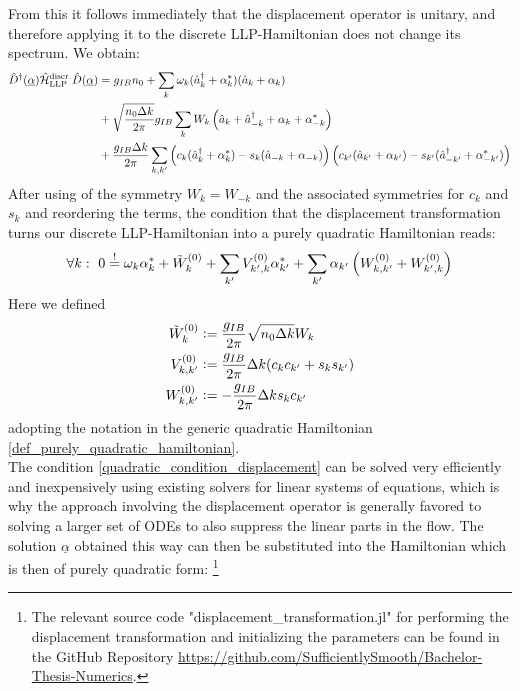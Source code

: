 From this it follows immediately that the displacement operator is unitary, and therefore applying it to the discrete LLP-Hamiltonian does not change its spectrum.
We obtain:
\begin{align}
\hat D^\dagger(\underline \alpha)\hat{\mathcal{H}}_{\mathrm{LLP}}^{\mathrm{discr.}}\hat D(\underline\alpha) &=g_{IB}n_0+\sum\limits_k \omega_{ k}(\hat a^\dagger_{ k}+\alpha_k^*)(\hat a_{ k}+\alpha_k)\nonumber\\
&+\sqrt{\frac{n_0\Delta k}{2\pi}}g_{IB}\sum\limits_k W_k \left(\hat a_{ k}+\hat a^\dagger_{- k}+\alpha_k+\alpha_{-k}^*\right) \nonumber\\ 
&+ \frac{g_{IB}\Delta k}{2\pi}\sum\limits_{k,k^\prime} \left(c_k(\hat a^\dagger_k+\alpha_k^*)-s_k(\hat a_{-k}+\alpha_{-k})\right)\left(c_{k^\prime}(\hat a_{k^\prime}+\alpha_{k^\prime})-s_{k^\prime}(\hat a^\dagger_{-k^\prime}+\alpha_{-k^\prime}^*)\right)
\end{align}
After using of the symmetry $W_k=W_{-k}$ and the associated symmetries for $c_k$ and $s_k$ and reordering the terms, the condition that the displacement transformation turns our discrete LLP-Hamiltonian into a purely quadratic Hamiltonian reads:
\begin{equation}\label{quadratic_condition_displacement}
\forall k:\ 0\overset{!}{=}\omega_k\alpha_k^*+\tilde W_k^{(0)}+\sum\limits_{k^\prime}V_{k^\prime,k}^{(0)}\alpha_{k^\prime}^*+\sum\limits_{k^\prime}\alpha_{k^\prime}\left(W_{k,k^\prime}^{(0)}+W_{k^\prime,k}^{(0)}\right)
\end{equation}
Here we defined
\begin{subequations}
\begin{align}
\tilde W_k^{(0)}&\vcentcolon= \frac{g_{IB}}{2\pi}\sqrt{n_0\Delta k} W_k\\
V_{k,k^\prime}^{(0)}&\vcentcolon=\frac{g_{IB}}{2\pi}\Delta k(c_k c_{k^\prime}+s_{k}s_{k^\prime})\\
W_{k,k^\prime}^{(0)}&\vcentcolon= -\frac{g_{IB}}{2\pi}\Delta k s_k c_{k^\prime}
\end{align}
\end{subequations}
adopting the notation in the generic quadratic Hamiltonian \ref{def_purely_quadratic_hamiltonian}.\\
The condition \ref{quadratic_condition_displacement} can be solved very efficiently and inexpensively using existing solvers for linear systems of equations, which is why the approach involving the displacement operator is generally favored to solving a larger set of ODEs to also suppress the linear parts in the flow. The solution $\underline\alpha$ obtained this way can then be substituted into the Hamiltonian which is then of purely quadratic form: \footnote{The relevant source code "displacement\_transformation.jl" for performing the displacement transformation and initializing the parameters can be found in the GitHub Repository \url{https://github.com/SufficientlySmooth/Bachelor-Thesis-Numerics}.}
